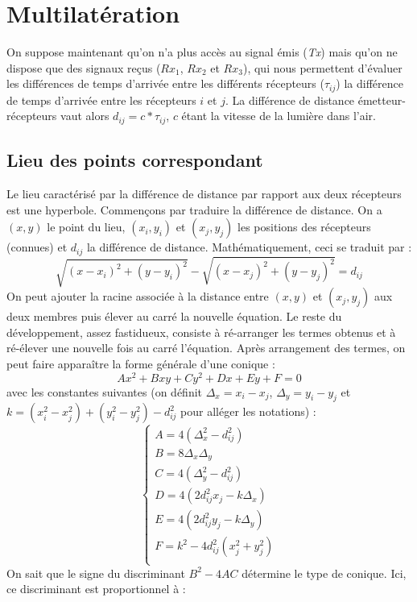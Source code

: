 \documentclass[10pt,a4paper]{article}
\begin{document}
\section{Multilatération}
On suppose maintenant qu'on n'a plus accès au signal émis (\textit{Tx}) mais qu'on ne dispose que des signaux reçus ($Rx_1$, $Rx_2$ et $Rx_3$), qui nous permettent d'évaluer les différences de temps d'arrivée entre les différents récepteurs ($\tau_{ij}$) la différence de temps d'arrivée entre les récepteurs $i$ et $j$. La différence de distance émetteur-récepteurs vaut alors $d_{ij} = c*\tau_{ij}$, $c$ étant la vitesse de la lumière dans l'air.
\subsection{Lieu des points correspondant}
Le lieu caractérisé par la différence de distance par rapport aux deux récepteurs est une hyperbole. Commençons par traduire la différence de distance. On a $(x,y)$ le point du lieu, $(x_i,y_i)$ et $(x_j,y_j)$ les positions des récepteurs (connues) et $d_{ij}$ la différence de distance. Mathématiquement, ceci se traduit par :
\begin{equation}
\sqrt{(x-x_i)^2 + (y-y_i)^2} - \sqrt{(x-x_j)^2 + (y-y_j)^2} = d_{ij}
\label{Hyperbole}
\end{equation}
On peut ajouter la racine associée à la distance entre $(x,y)$ et $(x_j,y_j)$ aux deux membres puis élever au carré la nouvelle équation. Le reste du développement, assez fastidueux, consiste à ré-arranger les termes obtenus et à ré-élever une nouvelle fois au carré l'équation. Après arrangement des termes, on peut faire apparaître la forme générale d'une conique :
\begin{equation}
Ax^2 + Bxy + Cy^2 + Dx + Ey + F = 0
\end{equation}
avec les constantes suivantes (on définit $\Delta_x = x_i - x_j$, $\Delta_y = y_i - y_j$ et $k = (x_i^2 - x_j^2) + (y_i^2 - y_j^2) - d_{ij}^2$ pour alléger les notations) :
$$\begin{cases}
A = 4(\Delta_x^2 - d_{ij}^2)\\
B = 8\Delta_x \Delta_y\\
C = 4(\Delta_y^2 - d_{ij}^2)\\
D = 4(2d_{ij}^2x_j-k\Delta_x)\\
E = 4(2d_{ij}^2y_j-k\Delta_y)\\
F = k^2-4d_{ij}^2(x_j^2+y_j^2)\\
\end{cases}$$
On sait que le signe du discriminant $B^2 - 4AC$ détermine le type de conique. Ici, ce discriminant est proportionnel à :
\end{document}
